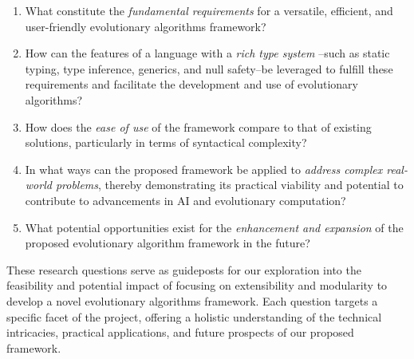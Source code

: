         \begin{enumerate}
        \item What constitute the \textit{fundamental requirements} for a versatile, efficient, and user-friendly
            evolutionary algorithms framework?
        \item How can the features of a language with a \textit{rich type system} --such as static typing, type 
            inference, generics, and null safety--be leveraged to fulfill these requirements and facilitate the 
            development and use of evolutionary algorithms?
        \item How does the \textit{ease of use} of the framework compare to that of existing solutions, particularly in
            terms of syntactical complexity?
        \item In what ways can the proposed framework be applied to \textit{address complex real-world problems}, 
            thereby demonstrating its practical viability and potential to contribute to advancements in AI and 
            evolutionary computation?
        \item What potential opportunities exist for the \textit{enhancement and expansion} of the proposed 
            evolutionary algorithm framework in the future?
        \end{enumerate}
        
        These research questions serve as guideposts for our exploration into the feasibility and potential impact of 
        focusing on extensibility and modularity to develop a novel evolutionary algorithms framework. Each question 
        targets a specific facet of the project, offering a holistic understanding of the technical intricacies, 
        practical applications, and future prospects of our proposed framework.